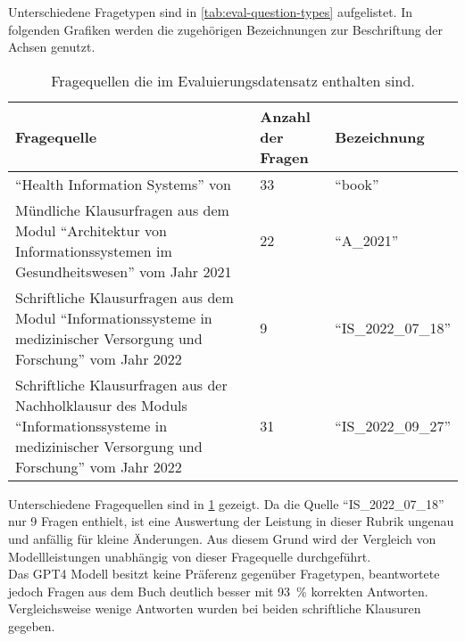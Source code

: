 Unterschiedene Fragetypen sind in \cref{tab:eval-question-types} aufgelistet.
In folgenden Grafiken werden die zugehörigen Bezeichnungen zur Beschriftung der Achsen genutzt.
\begin{table}
    \centering
    \begin{tabularx}{\textwidth}{Xll}
        \toprule
        \textbf{Fragequelle}                                                                                                                               & \textbf{Anzahl der Fragen} & \textbf{Bezeichnung}       \\
        \midrule
        \enquote{Health Information Systems} von \citet{bb}                                                                                                & 33                         & \enquote{book}             \\
        \midrule
        Mündliche Klausurfragen aus dem Modul \enquote{Architektur von Informationssystemen im Gesundheitswesen} vom Jahr 2021                             & 22                         & \enquote{A\_2021}          \\
        \midrule
        Schriftliche Klausurfragen aus dem Modul \enquote{Informationssysteme in medizinischer Versorgung und Forschung} vom Jahr 2022                     & 9                          & \enquote{IS\_2022\_07\_18} \\
        \midrule
        Schriftliche Klausurfragen aus der Nachholklausur des Moduls \enquote{Informationssysteme in medizinischer Versorgung und Forschung} vom Jahr 2022 & 31                         & \enquote{IS\_2022\_09\_27} \\
        \bottomrule
    \end{tabularx}
    \caption{Fragequellen die im Evaluierungsdatensatz enthalten sind.}\label{tab:eval-question-sources}
\end{table}

Unterschiedene Fragequellen sind in \cref{tab:eval-question-sources} gezeigt.
Da die Quelle \enquote{IS\_2022\_07\_18} nur 9 Fragen enthielt, ist eine Auswertung der Leistung in dieser Rubrik ungenau und anfällig für kleine Änderungen.
Aus diesem Grund wird der Vergleich von Modellleistungen unabhängig von dieser Fragequelle durchgeführt.\\

Das GPT4 Modell besitzt keine Präferenz gegenüber Fragetypen, beantwortete jedoch Fragen aus dem Buch deutlich besser mit \SI{93}{\percent} korrekten Antworten.
Vergleichsweise wenige Antworten wurden bei beiden schriftliche Klausuren gegeben.\\

